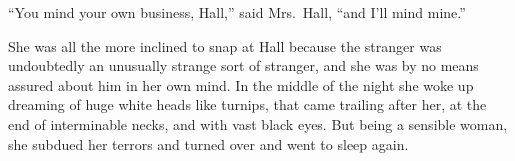 “You mind your own business, Hall,” said Mrs.\ Hall, “and I’ll mind mine.”

She was all the more inclined to snap at Hall because the stranger was undoubtedly an unusually strange sort of stranger, and she was by no means assured about him in her own mind. In the middle of the night she woke up dreaming of huge white heads like turnips, that came trailing after her, at the end of interminable necks, and with vast black eyes. But being a sensible woman, she subdued her terrors and turned over and went to sleep again.
